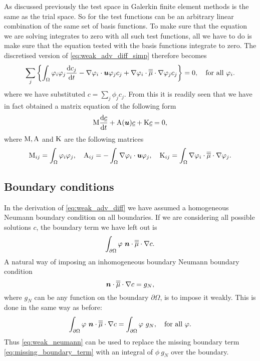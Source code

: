As discussed previously the test space in Galerkin finite element methods is the same as the
trial space. So for \PN the test functions can be an arbitrary linear combination
of the same set of basis functions. To make sure that the equation we are solving
integrates to zero with all such test functions, all we have to do is make sure
that the equation tested with the basis functions integrate to zero. The discretised
version of \eqref{eq:weak_adv_diff_simp} therefore becomes
\begin{equation}
  \sum_j \left\{ \int_\Omega \varphi_i \varphi_j  \frac{\mathrm{d} c_j}{\mathrm{d} t} -
    \nabla\varphi_i\cdot{\mbox{\boldmath$u$}}\varphi_j  c_j +
    \nabla\varphi_i\cdot \overline{\overline{\mu}}\cdot\nabla \varphi_j c_j \right\} = 0,
    \quad\text{for all }\varphi_i.
\end{equation}
where we have substituted $c=\sum_j \phi_j c_j$. From this it is readily seen that
we have in fact obtained a matrix equation of the following form
\begin{equation}
  \mathrm{M} \frac{\mathrm{d}\underline{c}}{\mathrm{d} t}+\mathrm{A}({\mbox{\boldmath$u$}})\underline{c}+\mathrm{K}\underline{c}=0,
  \label{eq:cg_adv_diff_mat}
\end{equation}
where $\mathrm{M}, \mathrm{A}$ and $\mathrm{K}$ are the following matrices
\begin{equation}
  \mathrm{M}_{ij}=\int_\Omega \varphi_i\varphi_j, \quad
  \mathrm{A}_{ij}=-\int_\Omega \nabla\varphi_i\cdot{\mbox{\boldmath$u$}} \varphi_j, \quad
  \mathrm{K}_{ij}=\int_\Omega \nabla\varphi_i\cdot \overline{\overline{\mu}}\cdot\nabla \varphi_j.
\end{equation}

\subsection{Boundary conditions}
In the derivation of \eqref{eq:weak_adv_diff} we have assumed a homogeneous Neumann
boundary condition on all boundaries. If we are considering all possible
solutions $c$, the boundary term we have left out is
\begin{equation}\label{eq:missing_boundary_term}
  \int_{\partial\Omega} \varphi~{\mbox{\boldmath$n$}}\cdot\overline{\overline{\mu}}\cdot\nabla c.
\end{equation}
A natural way of imposing an inhomogeneous boundary Neumann boundary condition
\begin{equation*}
  {\mbox{\boldmath$n$}}\cdot\overline{\overline{\mu}}\cdot\nabla c=g_N,
\end{equation*}
where $g_N$ can be any function on the boundary $\partial\Omega$, is to impose it
weakly. This is done in the same way as before:
\begin{equation}\label{eq:weak_neumann}
  \int_{\partial\Omega} \varphi~{\mbox{\boldmath$n$}}\cdot\overline{\overline{\mu}}\cdot\nabla c=
    \int_{\partial\Omega} \varphi~g_N, \quad \text{for all }\varphi.
\end{equation}
Thus \eqref{eq:weak_neumann} can be used to replace the missing
boundary term \eqref{eq:missing_boundary_term} with an integral of $\phi~g_N$
over the boundary.

